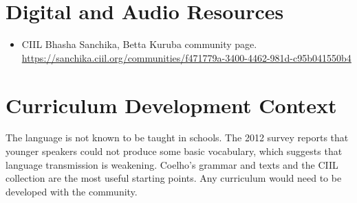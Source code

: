 \documentclass[12pt]{article}
\begin{document}
\section{Digital and Audio Resources}
\begin{itemize}
\item CIIL Bhasha Sanchika, Betta Kuruba community page. \url{https://sanchika.ciil.org/communities/f471779a-3400-4462-981d-c95b041550b4}
\end{itemize}

\section{Curriculum Development Context}
The language is not known to be taught in schools. The 2012 survey reports that younger speakers could not produce some basic vocabulary, which suggests that language transmission is weakening. Coelho's grammar and texts and the CIIL collection are the most useful starting points. Any curriculum would need to be developed with the community.
\end{document}
